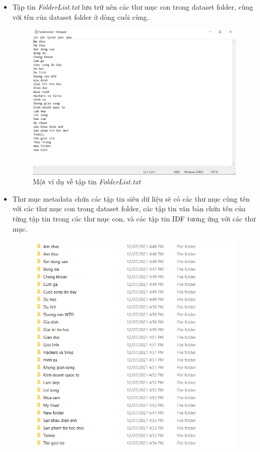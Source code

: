 \documentclass[12pt,a4paper]{article}
\begin{document}
\begin{itemize}
\item Tập tin \textit{FolderList.txt} lưu trữ nên các thư mục con trong dataset folder, cùng với tên của dataset folder ở dòng cuối cùng.
\begin{figure}[H]
\begin{center}
\includegraphics[scale=0.5]{Fig9}
\end{center}
\caption{Một ví dụ về tập tin \textit{FolderList.txt}}
\label{Fig9}
\end{figure}
\item Thư mục metadata chứa các tập tin siêu dữ liệu sẽ có các thư mục cùng tên với các thư mục con trong dataset folder, các tập tin văn bản chứa tên của từng tập tin trong các thư mục con, và các tập tin IDF tương ứng với các thư mục.
\begin{figure}[H]
\begin{center}
\includegraphics[scale=0.5]{Fig10}

\end{center}
\end{figure}
\end{itemize}
\end{document}
